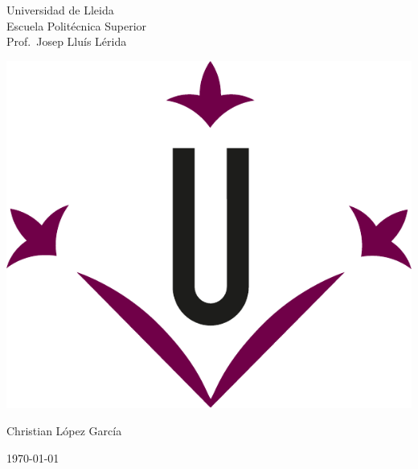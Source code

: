 \documentclass[../main.tex]{subfiles}
\begin{document}
\begin{titlepage}
    \begin{minipage}[c]{0.4\linewidth}
    Universidad de Lleida\\
    Escuela Politécnica Superior\\
    Prof.\ Josep Lluís Lérida\\
    \end{minipage}
    \hfill
    \begin{minipage}[c]{0.5\linewidth}
    \hfill
    \includegraphics[width=0.5\linewidth]{media/figures/udl_logo.pdf}
    \end{minipage}
        
    \vspace{5cm}

            
    \vspace{5cm}
        
    \begin{flushright}
        \large
        Christian López García
    \end{flushright}
        
    \vfill
        
    \begin{center}
        \today
    \end{center}
\end{titlepage}
\end{document}
